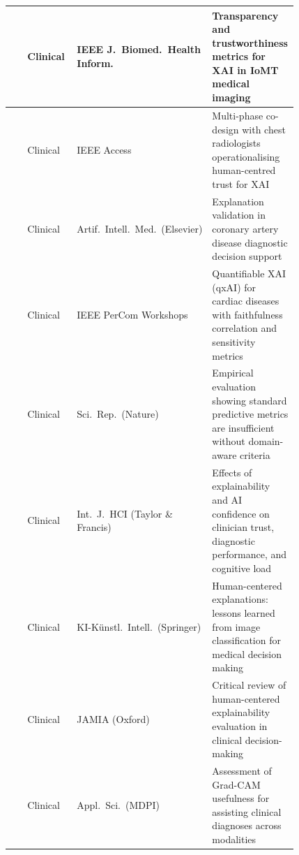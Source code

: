 \begin{longtable}{|>{\raggedright\arraybackslash}p{0.14\linewidth}|>{\raggedright\arraybackslash}p{0.20\linewidth}|>{\raggedright\arraybackslash}p{0.17\linewidth}|>{\raggedright\arraybackslash}p{0.31\linewidth}|}
\cite{10328849} & Clinical & IEEE J.\ Biomed.\ Health Inform. & Transparency and trustworthiness metrics for XAI in IoMT medical imaging \\
\hline
\cite{11355720} & Clinical & IEEE Access & Multi-phase co-design with chest radiologists operationalising human-centred trust for XAI \\
\hline
\cite{Kukar2011} & Clinical & Artif.\ Intell.\ Med.\ (Elsevier) & Explanation validation in coronary artery disease diagnostic decision support \\
\hline
\cite{Pandey2024} & Clinical & IEEE PerCom Workshops & Quantifiable XAI (qxAI) for cardiac diseases with faithfulness correlation and sensitivity metrics \\
\hline
\cite{hicks2022evaluation} & Clinical & Sci.\ Rep.\ (Nature) & Empirical evaluation showing standard predictive metrics are insufficient without domain-aware criteria \\
\hline
\cite{rezaeian2026explainability} & Clinical & Int.\ J.\ HCI (Taylor \& Francis) & Effects of explainability and AI confidence on clinician trust, diagnostic performance, and cognitive load \\
\hline
\cite{finzel2024human} & Clinical & KI-K{\"u}nstl.\ Intell.\ (Springer) & Human-centered explanations: lessons learned from image classification for medical decision making \\
\hline
\cite{bauer2025human} & Clinical & JAMIA (Oxford) & Critical review of human-centered explainability evaluation in clinical decision-making \\
\hline
\cite{chien2022usefulness} & Clinical & Appl.\ Sci.\ (MDPI) & Assessment of Grad-CAM usefulness for assisting clinical diagnoses across modalities \\
\hline


\end{longtable}
